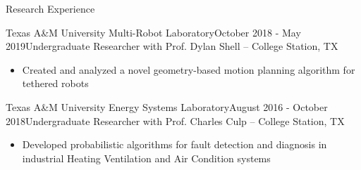 \documentclass{resume} %
\begin{document}
\begin{rSection}{Research Experience}
\begin{rSubsection}{Texas A\&M University Multi-Robot Laboratory}{October 2018 - May 2019}{Undergraduate Researcher with Prof. Dylan Shell -- College Station, TX}
\begin{itemize}
    \setlength\itemsep{0em}
    \item Created and analyzed a novel geometry-based motion planning algorithm for tethered robots
\end{itemize}
\end{rSubsection}
\begin{rSubsection}{Texas A\&M University Energy Systems Laboratory}{August 2016 - October 2018}{Undergraduate Researcher with Prof. Charles Culp -- College Station, TX}

\begin{itemize}
    \setlength\itemsep{0em}
    \item Developed probabilistic algorithms for fault detection and diagnosis in industrial Heating Ventilation and Air Condition systems
\end{itemize}
\end{rSubsection}
\end{rSection}

\end{document}
